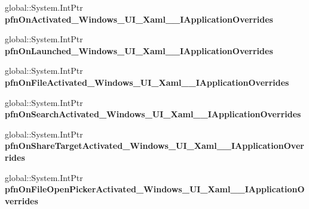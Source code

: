 \begin{DoxyCompactItemize}
global\+::\+System.\+Int\+Ptr {\bfseries pfn\+On\+Activated\+\_\+\+Windows\+\_\+\+U\+I\+\_\+\+Xaml\+\_\+\+\_\+\+I\+Application\+Overrides}
\item 
\mbox{\label{struct_windows_1_1_u_i_1_1_xaml_1_1_i_application_overrides_____impl_1_1_vtbl_a5dcd76352f21a7c3545aebe12fb03caa}} 
global\+::\+System.\+Int\+Ptr {\bfseries pfn\+On\+Launched\+\_\+\+Windows\+\_\+\+U\+I\+\_\+\+Xaml\+\_\+\+\_\+\+I\+Application\+Overrides}
\item 
\mbox{\label{struct_windows_1_1_u_i_1_1_xaml_1_1_i_application_overrides_____impl_1_1_vtbl_a87ae1071e259bdb7492da0ebc0f555d4}} 
global\+::\+System.\+Int\+Ptr {\bfseries pfn\+On\+File\+Activated\+\_\+\+Windows\+\_\+\+U\+I\+\_\+\+Xaml\+\_\+\+\_\+\+I\+Application\+Overrides}
\item 
\mbox{\label{struct_windows_1_1_u_i_1_1_xaml_1_1_i_application_overrides_____impl_1_1_vtbl_af6aba900fd3545ff6c2dde1240cfa821}} 
global\+::\+System.\+Int\+Ptr {\bfseries pfn\+On\+Search\+Activated\+\_\+\+Windows\+\_\+\+U\+I\+\_\+\+Xaml\+\_\+\+\_\+\+I\+Application\+Overrides}
\item 
\mbox{\label{struct_windows_1_1_u_i_1_1_xaml_1_1_i_application_overrides_____impl_1_1_vtbl_ad6fd81f8c235f2f02fd2be601429a7ad}} 
global\+::\+System.\+Int\+Ptr {\bfseries pfn\+On\+Share\+Target\+Activated\+\_\+\+Windows\+\_\+\+U\+I\+\_\+\+Xaml\+\_\+\+\_\+\+I\+Application\+Overrides}
\item 
\mbox{\label{struct_windows_1_1_u_i_1_1_xaml_1_1_i_application_overrides_____impl_1_1_vtbl_a81ef42d4adacb443a03bab1020b3d6d7}} 
global\+::\+System.\+Int\+Ptr {\bfseries pfn\+On\+File\+Open\+Picker\+Activated\+\_\+\+Windows\+\_\+\+U\+I\+\_\+\+Xaml\+\_\+\+\_\+\+I\+Application\+Overrides}
\item 
\mbox{\label{struct_windows_1_1_u_i_1_1_xaml_1_1_i_application_overrides_____impl_1_1_vtbl_a7a6c045ca88a411d94a582483bbb7e4a}} 

\end{DoxyCompactItemize}

